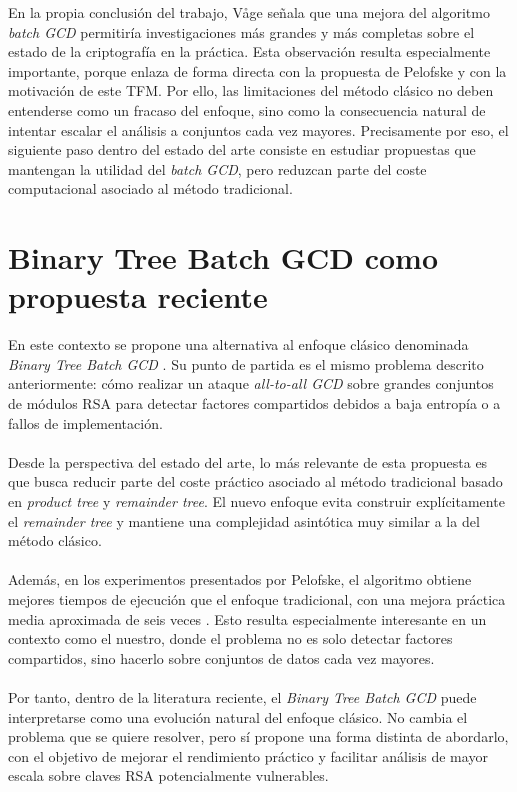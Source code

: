 En la propia conclusión del trabajo, Våge señala que una mejora del algoritmo \textit{batch GCD} permitiría investigaciones más grandes y más completas sobre el estado de la criptografía en la práctica. Esta observación resulta especialmente importante, porque enlaza de forma directa con la propuesta de Pelofske y con la motivación de este TFM. Por ello, las limitaciones del método clásico no deben entenderse como un fracaso del enfoque, sino como la consecuencia natural de intentar escalar el análisis a conjuntos cada vez mayores. Precisamente por eso, el siguiente paso dentro del estado del arte consiste en estudiar propuestas que mantengan la utilidad del \textit{batch GCD}, pero reduzcan parte del coste computacional asociado al método tradicional.

\section{Binary Tree Batch GCD como propuesta reciente}

En este contexto se propone una alternativa al enfoque clásico denominada \textit{Binary Tree Batch GCD} \citep{pelofske2024efficient}. Su punto de partida es el mismo problema descrito anteriormente: cómo realizar un ataque \textit{all-to-all GCD} sobre grandes conjuntos de módulos RSA para detectar factores compartidos debidos a baja entropía o a fallos de implementación.
\\
\\
Desde la perspectiva del estado del arte, lo más relevante de esta propuesta es que busca reducir parte del coste práctico asociado al método tradicional basado en \textit{product tree} y \textit{remainder tree}. El nuevo enfoque evita construir explícitamente el \textit{remainder tree} y mantiene una complejidad asintótica muy similar a la del método clásico.
\\
\\
Además, en los experimentos presentados por Pelofske, el algoritmo obtiene mejores tiempos de ejecución que el enfoque tradicional, con una mejora práctica media aproximada de seis veces \citep{pelofske2024efficient}. Esto resulta especialmente interesante en un contexto como el nuestro, donde el problema no es solo detectar factores compartidos, sino hacerlo sobre conjuntos de datos cada vez mayores.
\\
\\
Por tanto, dentro de la literatura reciente, el \textit{Binary Tree Batch GCD} puede interpretarse como una evolución natural del enfoque clásico. No cambia el problema que se quiere resolver, pero sí propone una forma distinta de abordarlo, con el objetivo de mejorar el rendimiento práctico y facilitar análisis de mayor escala sobre claves RSA potencialmente vulnerables.

